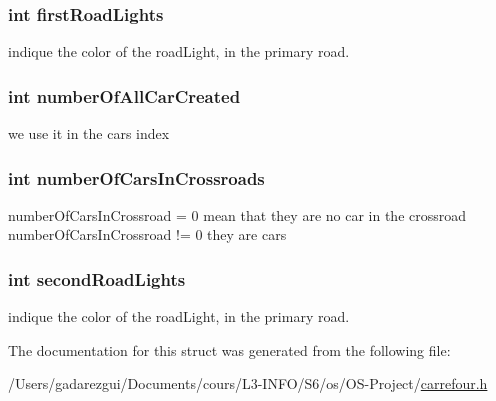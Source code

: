 \subsubsection[{first\+Road\+Lights}]{\setlength{\rightskip}{0pt plus 5cm}int first\+Road\+Lights}\label{struct_shared_ad4ad4398734cc6353a690ea60255bd86}
indique the color of the road\+Light, in the primary road. \hypertarget{struct_shared_a9390840c04ba9ffd6f2c936ed5de1ff6}{}
\subsubsection[{number\+Of\+All\+Car\+Created}]{\setlength{\rightskip}{0pt plus 5cm}int number\+Of\+All\+Car\+Created}\label{struct_shared_a9390840c04ba9ffd6f2c936ed5de1ff6}
we use it in the cars\textquotesingle{} index \hypertarget{struct_shared_a240252544115d3c3b18c3c2f80c97ca6}{}
\subsubsection[{number\+Of\+Cars\+In\+Crossroads}]{\setlength{\rightskip}{0pt plus 5cm}int number\+Of\+Cars\+In\+Crossroads}\label{struct_shared_a240252544115d3c3b18c3c2f80c97ca6}
number\+Of\+Cars\+In\+Crossroad = 0 mean that they are no car in the crossroad number\+Of\+Cars\+In\+Crossroad != 0 they are cars \hypertarget{struct_shared_af4c6d5f741ae4593a34b0cd8dce9321f}{}
\subsubsection[{second\+Road\+Lights}]{\setlength{\rightskip}{0pt plus 5cm}int second\+Road\+Lights}\label{struct_shared_af4c6d5f741ae4593a34b0cd8dce9321f}
indique the color of the road\+Light, in the primary road. 

The documentation for this struct was generated from the following file\+:\begin{DoxyCompactItemize}
\item 
/\+Users/gadarezgui/\+Documents/cours/\+L3-\/\+I\+N\+F\+O/\+S6/os/\+O\+S-\/\+Project/\hyperlink{carrefour_8h}{carrefour.\+h}\end{DoxyCompactItemize}
